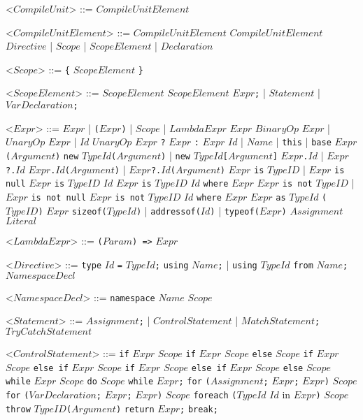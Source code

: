 \documentclass{article}
\newcommand{\gtext}[1]{<$#1$>}
\newcommand{\glit}[1]{\texttt{#1}}
\begin{document}
\begin{grammar}

	\gtext{CompileUnit} ::= $CompileUnitElement$

	\gtext{CompileUnitElement} ::= $CompileUnitElement$ $CompileUnitElement$
	\alt $Directive$ | $Scope$ | $ScopeElement$ | $Declaration$

	\gtext{Scope} ::= \glit{\{} $ScopeElement$ \glit{\}}
	
	\gtext{ScopeElement} ::= $ScopeElement$ $ScopeElement$
	\alt $Expr$\glit{;} | $Statement$	| $VarDeclaration$\glit{;}
	
	\gtext{Expr} ::= $Expr$ | \glit{(}$Expr$\glit{)} | $Scope$ | $LambdaExpr$
	\alt $Expr$ $BinaryOp$ $Expr$ | $UnaryOp$ $Expr$ | $Id$ $UnaryOp$
	\alt $Expr$ \glit{?} $Expr$ \glit{:} $Expr$
	\alt $Id$ | $Name$ | \glit{this} | \glit{base}
	\alt $Expr$\glit{(}$Argument$\glit{)}
	\alt \glit{new} $TypeId$\glit{(}$Argument$\glit{)} | \glit{new} $TypeId$\glit{[}$Argument$\glit{]}
	\alt $Expr$\glit{.}$Id$ | $Expr$\glit{?.}$Id$ 
	\alt $Expr$\glit{.}$Id$\glit{(}$Argument$\glit{)} | $Expr$\glit{?.}$Id$\glit{(}$Argument$\glit{)}
	\alt $Expr$ \glit{is} $TypeID$ | $Expr$ \glit{is null} $Expr$ \glit{is} $TypeID$ $Id$
	\alt $Expr$ \glit{is} $TypeID$ $Id$ \glit{where} $Expr$
	\alt $Expr$ \glit{is not} $TypeID$ | $Expr$ \glit{is not null}
	\alt $Expr$ \glit{is not} $TypeID$ $Id$ \glit{where} $Expr$ %
	\alt $Expr$ \glit{as} $TypeId$
	\alt \glit{(}$TypeID$\glit{)} $Expr$
	\alt \glit{sizeof($TypeId$}\glit{)} | \glit{addressof($Id$}\glit{)} | \glit{typeof($Expr$}\glit{)}
	\alt $Assignment$
	\alt $Literal$
	
	\gtext{LambdaExpr} ::= \glit{(}$Param$\glit{) =>} $Expr$
	
	\gtext{Directive} ::= \glit{type} $Id$ \glit{=} $TypeId$\glit{;}
	\alt \glit{using} $Name$\glit{;} | \glit{using} $TypeId$ \glit{from} $Name$\glit{;}
	\alt $NamespaceDecl$

	\gtext{NamespaceDecl} ::= \glit{namespace} $Name$ $Scope$
	
	\gtext{Statement} ::= $Assignment$\glit{;} | $ControlStatement$ | $MatchStatement$\glit{;}
	\alt $TryCatchStatement$
	
	\gtext{ControlStatement} ::= \glit{if} $Expr$ $Scope$
	\alt \glit{if} $Expr$ $Scope$ \glit{else} $Scope$
	\alt \glit{if} $Expr$ $Scope$ \glit{else if} $Expr$ $Scope$
	\alt \glit{if} $Expr$ $Scope$ \glit{else if} $Expr$ $Scope$ \glit{else} $Scope$
	\alt \glit{while} $Expr$ $Scope$
	\alt \glit{do} $Scope$ \glit{while} $Expr$\glit{;}
	\alt \glit{for} \glit{(}$Assignment$\glit{;} $Expr$\glit{;} $Expr$\glit{)} $Scope$
	\alt \glit{for} \glit{(}$VarDeclaration$\glit{;} $Expr$\glit{;} $Expr$\glit{)} $Scope$
	\alt \glit{foreach} \glit{(}$TypeId$ $Id$ {in} $Expr$\glit{)} $Scope$
	\alt \glit{throw} $TypeID$\glit{(}$Argument$\glit{)}
	\alt \glit{return} $Expr$\glit{;}
	\alt \glit{break;}
	

\end{grammar}
\end{document}
